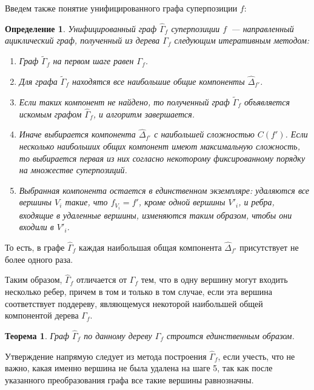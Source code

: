 \documentclass[12pt,a4paper]{article}
\newtheorem{theorem}{Теорема}
\newtheorem{defin}{Определение}
\begin{document}
Введем также понятие унифицированного графа суперпозиции $f$:
\begin{defin}
  Унифицированный граф $\hat{\Gamma}_f$ суперпозиции $f$~--- направленный
  ациклический граф, полученный из дерева $\Gamma_f$ следующим итеративным 
  методом:
  \begin{enumerate}
	\item Граф $\tilde{\Gamma}_f$ на первом шаге равен $\Gamma_f$.
	\item Для графа $\tilde{\Gamma}_f$ находятся все наибольшие общие компоненты
	  $\hat{\Delta}_{f'}$.
	\item Если таких компонент не найдено, то полученный граф $\tilde{\Gamma}_f$
	  объявляется искомым графом $\hat{\Gamma}_f$, и алгоритм завершается.
	\item Иначе выбирается компонента $\hat{\Delta}_{f'}$ с наибольшей
	  сложностью $C(f')$. Если несколько наибольших общих компонент имеют
	  максимальную сложность, то выбирается первая из них согласно некоторому
	  фиксированному порядку на множестве суперпозиций.
	\item Выбранная компонента остается в единственном экземпляре: удаляются
	  все вершины $V_i$ такие, что $f_{V_i} = f'$, кроме одной вершины $V'_i$,
	  и ребра, входящие в удаленные вершины, изменяются таким образом, чтобы
	  они входили в $V'_i$.
  \end{enumerate}
\end{defin}
То есть, в графе $\hat{\Gamma}_f$ каждая наибольшая общая компонента
$\hat{\Delta}_{f'}$ присутствует не более одного раза.

Таким образом, $\hat{\Gamma}_f$ отличается от $\Gamma_f$ тем, что в одну
вершину могут входить несколько ребер, причем в том и только в том случае,
если эта вершина соответствует поддереву, являющемуся некоторой наибольшей общей
компонентой дерева $\Gamma_f$.

\begin{theorem}
  Граф $\hat{\Gamma}_f$ по данному дереву $\Gamma_f$ строится единственным образом.
\end{theorem}
\begin{Proof}
  Утверждение напрямую следует из метода построения $\hat{\Gamma}_f$,
  если учесть, что не важно, какая именно вершина не была удалена на шаге 5,
  так как после указанного преобразования графа все такие вершины равнозначны.
\end{Proof}
\end{document}
